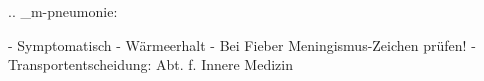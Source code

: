 
.. _m-pneumonie:


\begin{itemize}
  -   Symptomatisch
  -   Wärmeerhalt
  -   Bei Fieber Meningismus-Zeichen prüfen!
  -   Transportentscheidung: Abt. f. Innere Medizin
\end{itemize}